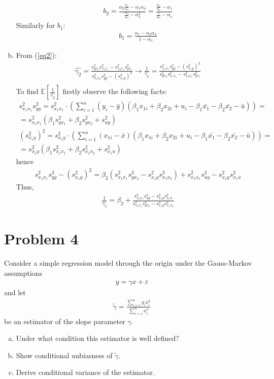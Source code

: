 \documentclass[a4paper]{article}
\newcommand{\expect}{\mathbb{E}}
\newcommand{\summa}{\sum_{i=1}^n}
\begin{document}
\begin{enumerate}[(a)]
	\begin{align*}
	b_2 = \frac{\alpha_2\frac{\alpha_4}{\alpha_3} - \alpha_1\alpha_4}{\frac{\alpha_4}{\alpha_3} - \alpha_4^2} = \frac{\frac{\alpha_2}{\alpha_3} - \alpha_1}{\frac{1}{\alpha_3} - \alpha_4}
	\end{align*}
	Similarly for $b_1$:
	\begin{align*}
	b_1 = \frac{\alpha_1 - \alpha_2 \alpha_4}{1 - \alpha_3}
	\end{align*}
	\item From (\ref{eq2}):
	\begin{align*}
	\hat{\gamma_2} = \frac{s^2_{yx_2}s^2_{x_1x_1} - s^2_{x_2x_1}s^2_{yx_1}}{s^2_{x_1x_1}s^2_{yy} - (s^2_{x_1y})^2} \to \frac{1}{\hat{\gamma_2}} = \frac{s^2_{x_1x_1}s^2_{yy} - (s^2_{x_1y})^2}{s^2_{yx_2}s^2_{x_1x_1} - s^2_{x_2x_1}s^2_{yx_1}}\\
	\end{align*}
	To find $\expect[\frac{1}{\hat{\gamma_2}}]$ firstly observe the following facts:
	\begin{align*}
	s^2_{x_1x_1}s^2_{yy} = s^2_{x_1x_1}\cdot(\summa (y_i - \bar{y})(\beta_1x_{1i} + \beta_2x_{2i} + u_i - \beta_1\bar{x_1} - \beta_2 \bar{x_2} - \bar{u})) = \\
	=s^2_{x_1x_1} (\beta_1s^2_{yx_1} + \beta_2s^2_{yx_2} + s^2_{uy})\\
	(s_{x_1y}^2)^2 = s_{x_1y}^2 \cdot (\summa (x_{1i} - \bar{x})(\beta_1x_{1i} + \beta_2x_{2i} + u_i - \beta_1\bar{x_1} - \beta_2\bar{x_2} - \bar{u})) =\\ =s_{x_1y}^2 (\beta_1 s^2_{x_1x_1} + \beta_2s^2_{x_1x_2} + s^2_{x_1u})
	\end{align*}
	hence
	\begin{align*}
	s^2_{x_1x_1}s^2_{yy} - (s_{x_1y}^2)^2 = \beta_2(s^2_{x_1x_1}s^2_{yx_2} - s^2_{x_1y}s^2_{x_1x_2}) + s^2_{x_1x_1}s^2_{uy} - s^2_{x_1y}s^2_{x_1u}
	\end{align*}
	Thus,
	\begin{align*}
	\frac{1}{\hat{\gamma_2}} = \beta_2 + \frac{s^2_{x_1x_1}s^2_{uy} - s^2_{x_1y}s^2_{x_1u}}{s^2_{x_1x_1}s^2_{yx_2} - s^2_{x_1y}s^2_{x_1x_2}}
	\end{align*}
\end{enumerate}
\section*{Problem 4}
Consider a simple regression model through the origin under the Gauss-Markov assumptions
\begin{align*}
y = \gamma x + \varepsilon
\end{align*}
and let
\begin{align*}
\tilde{\gamma} = \frac{\summa y_ix_i^3}{\summa x_i^4}
\end{align*}
be an estimator of the slope parameter $\gamma$.
\begin{enumerate}[(a)]
\item Under what condition this estimator is well defined?
\item Show conditional unbiasness of $\tilde{\gamma}$.
\item Derive conditional variance of the estimator.
\end{enumerate}
\end{document}
